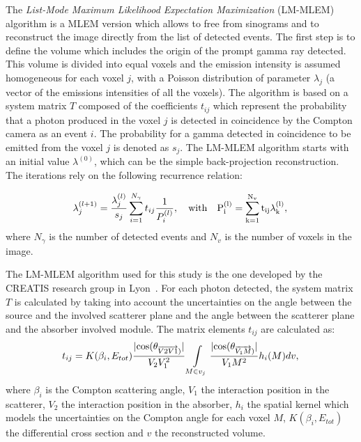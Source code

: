 The \textit{List-Mode Maximum Likelihood Expectation Maximization} (LM-MLEM) algorithm is a MLEM version which allows to free from sinograms and to reconstruct the image directly from the list of detected events.
The first step is to define the volume which includes the origin of the prompt gamma ray detected. This volume is divided into equal voxels and the emission intensity is assumed homogeneous for each voxel $j$, with a Poisson distribution of parameter $\lambda_j$ (a vector of the emissions intensities of all the voxels). The algorithm is based on a system matrix $T$ composed of the coefficients  $t_{ij}$ which represent the probability that a photon produced in the voxel $j$ is detected in coincidence by the Compton camera as an event $i$. The probability for a gamma detected in coincidence to be emitted from the voxel $j$ is denoted as $s_j$.
The LM-MLEM algorithm starts with an initial value $\lambda^{(0)}$, which can be the simple back-projection reconstruction.
The iterations rely on the following recurrence relation:

\begin{equation}
\lambda_j^{(l+1)} =  \frac{\lambda_j^{(l)} }{s_j} \sum\limits_{i=1}^{N_{\gamma}} t_{ij} \frac{1}{P_i^{(l)}},\quad \rm{with}\quad  P_i^{(l)}=\sum\limits_{k=1}^{N_{v}} t_{ij}\lambda_k^{(l)},
 \label{eq:equation_lambda_compton_med_nucleaire}\newline
\end{equation}
where $N_{\gamma}$ is the number of detected events and $N_v$ is the number of voxels in the image.\newline

The LM-MLEM algorithm used for this study is the one developed by the CREATIS research group in Lyon~\cite{maxim_filtered_2014,hilaire_compton_2014}.\newline%
For each photon detected, the system matrix $T$ is calculated by taking into account the uncertainties on the angle between the source and the involved scatterer plane and the angle between the scatterer plane and the absorber involved module.
The matrix elements $t_{ij}$ are calculated as:
\begin{equation}
 t_{ij} = K(\beta_i,E_{tot})\frac{|\rm{cos}(\theta_{\overrightarrow{V2V1})} |}{V_2V_1^2} \int\limits_{M\in v_j} \frac{|\rm{cos}(\theta_{\overrightarrow{V_1M})}| }{V_1M^2} h_i(M)dv,
 \label{eq:equation_tij_compton_med_nucleaire}\newline
\end{equation}
where $\beta_i$ is the Compton scattering angle, $V_1$ the interaction position in the scatterer, $V_2$ the interaction position in the absorber, $h_i$ the spatial kernel which models the uncertainties on the Compton angle for each voxel $M$, $K(\beta_i,E_{tot})$ the differential cross section and $v$ the reconstructed volume.\newline

